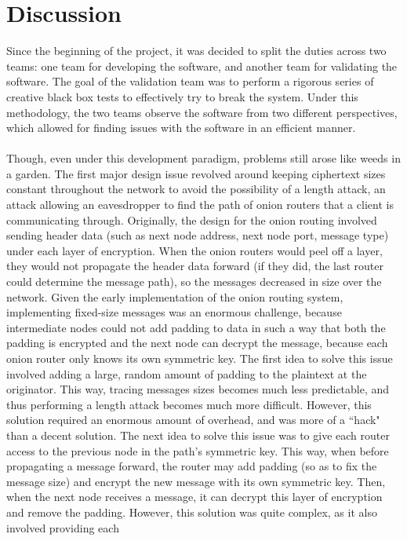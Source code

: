 \documentclass[10pt]{report}
\begin{document}
\chapter{Discussion}
Since the beginning of the project, it was decided to split the duties across two teams: one team
for developing the software, and another team for validating the software. The goal of the
validation team was to perform a rigorous series of creative black box tests to effectively try to
break the system. Under this methodology, the two teams observe the software from two different
perspectives, which allowed for finding issues with the software in an efficient manner.\\\\
Though, even under this development paradigm, problems still arose like weeds in a garden. The first
major design issue revolved around keeping ciphertext sizes constant throughout the network to avoid
the possibility of a length attack, an attack allowing an eavesdropper to find the path of onion
routers that a client is communicating through. Originally, the design for the onion routing
involved sending header data (such as next node address, next node port, message type) under each
layer of encryption. When the onion routers would peel off a layer, they would not propagate the
header data forward (if they did, the last router could determine the message path), so the messages
decreased in size over the network. Given the early implementation of the onion routing
system, implementing fixed-size messages was an enormous challenge, because intermediate nodes could
not add padding to
data in such a way that both the padding is encrypted and the next node can decrypt the message,
because each onion router only knows its own symmetric key. The first idea to solve this issue
involved adding a large, random amount of padding to the plaintext at the originator. This way,
tracing messages sizes becomes much less predictable, and thus performing a length attack becomes
much more difficult. However, this solution required an enormous amount of overhead, and was more of
a ``hack" than a decent solution. The next idea to solve this issue was to give each router access to
the previous node in the path's symmetric key. This way, when before propagating a message forward,
the router may add padding (so as to fix the message size) and encrypt the new message with its own
symmetric key. Then, when the next node receives a message, it can decrypt this layer of encryption
and remove the padding. However, this solution was quite complex, as it also involved providing each
\end{document}
